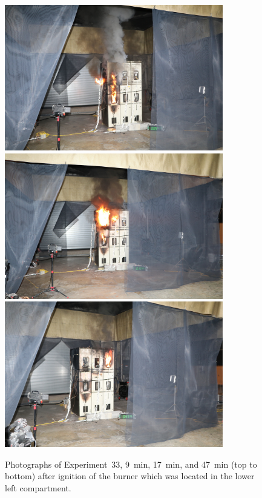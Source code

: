 \begin{figure}[p]
\centering
\includegraphics[height=2.50in]{../FIGURES/Test_33_9_min} \\
\includegraphics[height=2.50in]{../FIGURES/Test_33_17_min} \\
\includegraphics[height=2.50in]{../FIGURES/Test_33_47_min}
\caption[Photographs of Experiment~33]{Photographs of Experiment~33, 9~min, 17~min, and 47~min (top to bottom) after ignition of the burner which was located in the lower left compartment.}
\label{fig:Test_33_photos}
\end{figure}



\clearpage

